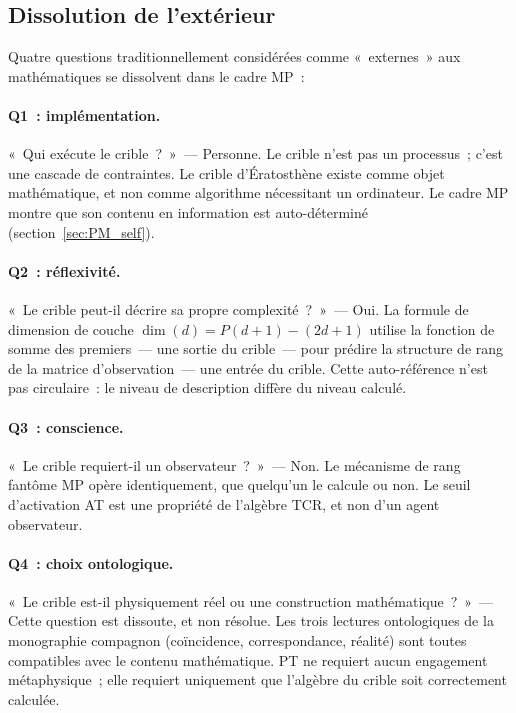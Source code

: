 \documentclass[12pt,a4paper]{article}
\begin{document}
\subsection{Dissolution de l'extérieur}
\label{sec:PM_exterior}

Quatre questions traditionnellement considérées comme «~externes~» aux
mathématiques se dissolvent dans le cadre MP~:

\paragraph{Q1~: implémentation.}
«~Qui exécute le crible~?~»~--- Personne. Le crible n'est pas un
processus~; c'est une cascade de contraintes. Le crible
d'Ératosthène existe comme objet mathématique, et non comme
algorithme nécessitant un ordinateur. Le cadre MP montre que son
contenu en information est auto-déterminé
(section~\ref{sec:PM_self}).

\paragraph{Q2~: réflexivité.}
«~Le crible peut-il décrire sa propre complexité~?~»~--- Oui. La
formule de dimension de couche $\dim(d) = P(d{+}1) - (2d{+}1)$
utilise la fonction de somme des premiers~--- une sortie du
crible~--- pour prédire la structure de rang de la matrice
d'observation~--- une entrée du crible. Cette auto-référence n'est
pas circulaire~: le niveau de description diffère du niveau calculé.

\paragraph{Q3~: conscience.}
«~Le crible requiert-il un observateur~?~»~--- Non. Le mécanisme de
rang fantôme MP opère identiquement, que quelqu'un le calcule ou
non. Le seuil d'activation AT est une propriété de l'algèbre TCR, et
non d'un agent observateur.

\paragraph{Q4~: choix ontologique.}
«~Le crible est-il physiquement réel ou une construction
mathématique~?~»~--- Cette question est dissoute, et non résolue. Les
trois lectures ontologiques de la monographie compagnon (coïncidence,
correspondance, réalité) sont toutes compatibles avec le contenu
mathématique. PT ne requiert aucun engagement métaphysique~; elle
requiert uniquement que l'algèbre du crible soit correctement
calculée.
\end{document}
